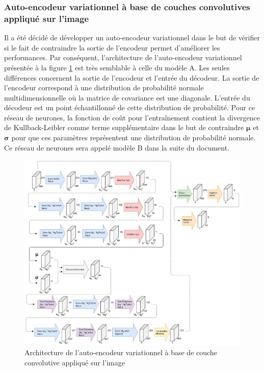 \subsubsection{Auto-encodeur variationnel à base de couches convolutives appliqué sur l'image}
    Il a été décidé de développer un auto-encodeur variationnel dans le but de vérifier si le fait de contraindre la sortie de l'encodeur permet d'améliorer les performances. Par conséquent, l'architecture de l'auto-encodeur variationnel présentée à la figure \ref{fig:architecture_cnn_vae} est très semblable à celle du modèle A. Les seules différences concernent la sortie de l'encodeur et l'entrée du décodeur. La sortie de l'encodeur correspond à une distribution de probabilité normale multidimensionnelle où la matrice de covariance est une diagonale. L'entrée du décodeur est un point échantillonné de cette distribution de probabilité. Pour ce réseau de neurones, la fonction de coût pour l'entraînement contient la divergence de Kullback-Leibler comme terme supplémentaire dans le but de contraindre \(\boldsymbol{\mu}\) et \(\boldsymbol{\sigma}\) pour que ces paramètres représentent une distribution de probabilité normale. Ce réseau de neurones sera appelé modèle B dans la suite du document.
    \begin{figure}
        \centering
        \includegraphics[width=17cm]{images/Architecture_CnnVae.png}
        \caption{Architecture de l'auto-encodeur variationnel à base de couche convolutive appliqué sur l'image}
        \label{fig:architecture_cnn_vae}
    \end{figure}

